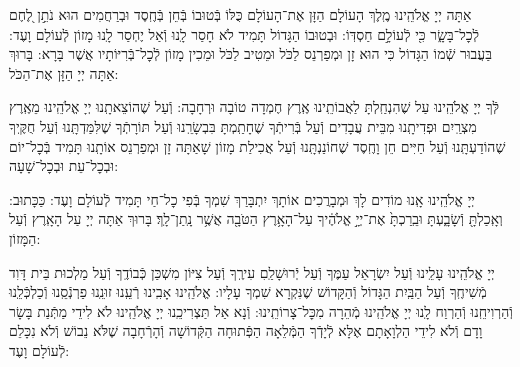 \documentclass[twoside, openany, parskip=half, 11pt]{book}
\begin{document}
\nextpage
{}
אַתָּה יְיָ אֱלֹהֵֽינוּ מֶֽלֶךְ הָעוֹלָם הַזָּן אֶת־הָעוֹלָם כֻּלּוֹ בְּֿטוּבוֹ בְּֿחֵן בְּֿחֶֽסֶד וּבְרַחֲמִים הוּא נֹתֵ֣ן לֶ֭חֶם לְֿכׇל־בָּשָׂ֑ר כִּ֖י לְֿעוֹלָ֣ם חַסְדּֽוֹ: וּבְטוּבוֹ הַגָּדוֹל תָּמִיד לֹא חָסַר לָֽנוּ וְֿאַל יֶחְסַר לָֽנוּ מָזוֹן לְֿעוֹלָם וָעֶד: בַּעֲבוּר שְֿׁמוֹ הַגָּדוֹל כִּי הוּא זָן וּמְפַרְנֵס לַכֹּל וּמֵטִיב לַכֹּל וּמֵכִין מָזוֹן לְֿכׇל־בְּֿרִיּוֹתָיו אֲשֶׁר בָּרָא: בָּרוּךְ אַתָּה יְיָ הַזָּן אֶת־הַכֹּל:



לְּֿךָ יְיָ אֱלֹהֵֽינוּ עַל שֶׁהִנְחַֽלְתָּ לַאֲבוֹתֵֽינוּ אֶֽרֶץ חֶמְדָה טוֹבָה וּרְחָבָה: וְֿעַל שֶׁהוֹצֵאתָֽנוּ יְיָ אֱלֹהֵֽינוּ מֵאֶֽרֶץ מִצְרַֽיִם וּפְדִיתָֽנוּ מִבֵּית עֲבָדִים וְֿעַל בְּֿרִיתְֿךָ שֶׁחָתַֽמְתָּ בִּבְשָׂרֵֽנוּ וְֿעַל תּוֹרָתְֿךָ שֶׁלִּמַּדְתָּֽנוּ וְֿעַל חֻקֶּֽיךָ שֶׁהוֹדַעְתָּֽנוּ וְֿעַל חַיִּים חֵן וָחֶֽסֶד שֶׁחוֹנַנְתָּֽנוּ וְֿעַל אֲכִילַת מָזוֹן שָׁאַתָּה זָן וּמְפַרְנֵס אוֹתָֽנוּ תָּמִיד בְּֿכׇל־יוֹם וּבְכׇל־עֵת וּבְכׇל־שָׁעָה:


\alhanisim

יְיָ אֱלֹהֵֽינוּ אָֽנוּ מוֹדִים לָךְ וּמְבָרֲכִים אוֹתָךְ יִתְבָּרַךְ שִׁמְךָ בְּֿפִי כׇל־חַי תָּמִיד לְֿעוֹלָם וָעֶד: כַּכָּתוּב: וְאָֽכַלְתָּ֖ וְֿשָׂבָ֑עְתָּ וּבֵֽרַכְתָּ֙ אֶת־יְיָ֣ אֱלֹהֶ֔יךָ עַל־הָאָ֥רֶץ הַטֹּבָ֖ה אֲשֶׁ֥ר נָֽתַן־לָֽךְ׃ בָּרוּךְ אַתָּה יְיָ עַל הָאָֽרֶץ וְֿעַל הַמָּזוֹן:



יְיָ אֱלֹהֵֽינוּ עָלֵֽינוּ וְֿעַל יִשְׂרָאֵל עַמֶּךָ וְֿעַל יְֿרוּשָׁלַֽםִ עִירֶֽךָ וְֿעַל צִיּוֹן מִשְׁכַּן כְּֿבוֹדֶֽךָ וְֿעַל מַלְכוּת בֵּית דָּוִד מְֿשִׁיחֶֽךָ וְֿעַל הַבַּֽיִת הַגָּדוֹל וְֿהַקָּדוֹשׁ שֶׁנִּקְרָא שִׁמְךָ עָלָיו: אֱלֹהֵֽינוּ אָבִֽינוּ רְֿעֵֽנוּ זוּנֵֽנוּ פַרְנְֿסֵֽנוּ וְֿכַלְכְּֿלֵֽנוּ וְֿהַרְוִיחֵֽנוּ וְֿהַרְוַח לָֽנוּ יְיָ אֱלֹהֵֽינוּ מְֿהֵרָה מִכׇּל־צָרוֹתֵֽינוּ: וְֿנָא אַל תַּצְרִיכֵֽנוּ יְיָ אֱלֹהֵֽינוּ לֹא לִידֵי מַתְּֿנַת בָּשָׂר וָדָם וְֿלֹא לִידֵי הַלְוָאָתָם אֶלָּא לְֿיָדְֿךָ הַמְּֿלֵאָה הַפְּֿתוּחָה הַקְּֿדוֹשָׁה וְֿהָרְֿחָבָה שֶׁלֹּא נֵבוֹשׁ וְֿלֹא נִכָּלֵם לְֿעוֹלָם וָעֶד:

\enlargethispage{\baselineskip}
\end{document}
